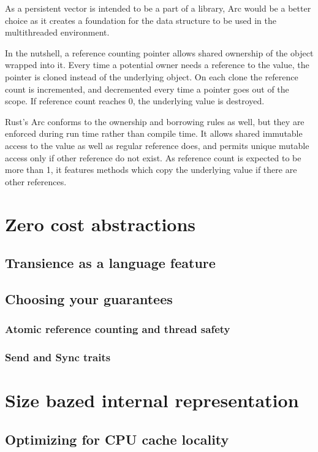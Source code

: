 
As a persistent vector is intended to be a part of a library, Arc would be a better choice as it creates a foundation for the data structure to be used in the multithreaded environment. 


In the nutshell, a reference counting pointer allows shared ownership of the object wrapped into it. Every time a potential owner needs a reference to the value, the pointer is cloned instead of the underlying object. On each clone the reference count is incremented, and decremented every time a pointer goes out of the scope. If reference count reaches 0, the underlying value is destroyed. 

Rust’s Arc conforms to the ownership and borrowing rules as well, but they are enforced during run time rather than compile time. It allows shared immutable access to the value as well as regular reference does, and permits unique mutable access only if other reference do not exist. As reference count is expected to be more than 1, it features methods which copy the underlying value if there are other references. 



\section{Zero cost abstractions}
\subsection{Transience as a language feature}
\subsection{Choosing your guarantees}
\subsubsection{Atomic reference counting and thread safety}
\subsubsection{Send and Sync traits}
\section{Size bazed internal representation}
\subsection{Optimizing for CPU cache locality}
